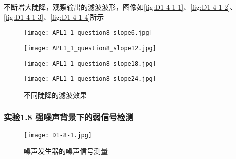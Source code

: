 \documentclass[dvipsnames, svgnames,a4paper,11pt]{article}
\begin{document}
	不断增大陡降，观察输出的滤波波形，图像如\cref{fig:D1-4-1-1}、\cref{fig:D1-4-1-2}、\cref{fig:D1-4-1-3}、\cref{fig:D1-4-1-4}所示



	\begin{figure}[htbp]
		\centering
		\begin{minipage}[b]{0.45\textwidth}
			\centering
			\texttt{[image: APL1\_1\_question8\_slope6.jpg]} %
			\caption{$Slope = 6 \mathrm{dB/oct}$}
			\label{fig:D1-4-1-1}
		\end{minipage}
		\hspace{0.05\textwidth} %
		\begin{minipage}[b]{0.45\textwidth}
			\centering
			\texttt{[image: APL1\_1\_question8\_slope12.jpg]} %
			\caption{$Slope = 12 \mathrm{dB/oct}$}
			\label{fig:D1-4-1-2}
		\end{minipage}
		
		\vspace{0.01\textwidth} %
	
		\begin{minipage}[b]{0.45\textwidth}
			\centering
			\texttt{[image: APL1\_1\_question8\_slope18.jpg]} %
			\caption{$Slope = 18 \mathrm{dB/oct}$}
			\label{fig:D1-4-1-3}
		\end{minipage}
		\hspace{0.05\textwidth} %
		\begin{minipage}[b]{0.45\textwidth}
			\centering
			\texttt{[image: APL1\_1\_question8\_slope24.jpg]} %
			\caption{$Slope = 24 \mathrm{dB/oct}$}
			\label{fig:D1-4-1-4}
		\end{minipage}
		\caption*{不同陡降的滤波效果}
		\label{fig:D1-4-1}
	\end{figure}









	\clearpage
	\subsubsection*{实验1.8 \quad 强噪声背景下的弱信号检测}

	\begin{wrapfigure}{l}{0.5\textwidth}
		\centering
		\texttt{[image: D1-8-1.jpg]}
		\caption{噪声发生器的噪声信号测量}
		\label{fig:D1-8-1}
	\end{wrapfigure}
\end{document}
